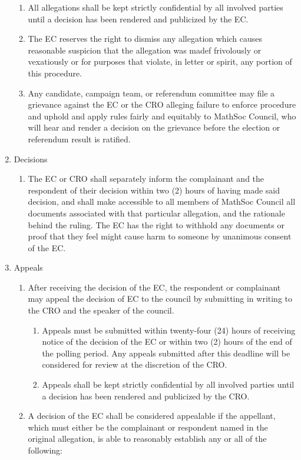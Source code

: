\begin{enumerate}
\begin{enumerate}
			\item All allegations shall be kept strictly confidential by all involved parties until a decision has been rendered and publicized by the EC.
			\item The EC reserves the right to dismiss any allegation which causes reasonable suspicion that the allegation was madef frivolously or vexatiously or for purposes that violate, in letter or spirit, any portion of this procedure.
			\item Any candidate, campaign team, or referendum committee may file a grievance against the EC or the CRO alleging failure to enforce procedure and uphold and apply rules fairly and equitably to MathSoc Council, who will hear and render a decision on the grievance before the election or referendum result is ratified.
		\end{enumerate}
	\item Decisions 
		\begin{enumerate}
			\item The EC or CRO shall separately inform the complainant and the respondent of their decision within two (2) hours of having made said decision, and shall make accessible to all members of MathSoc Council all documents associated with that particular allegation, and the rationale behind the ruling. The EC has the right to withhold any documents or proof that they feel might cause harm to someone by unanimous consent of the EC.
		\end{enumerate}
	\item Appeals 
		\begin{enumerate}
			\item After receiving the decision of the EC, the respondent or complainant may appeal the decision of EC to the council by submitting in writing to the CRO and the speaker of the council.
				\begin{enumerate}
					\item Appeals must be submitted within twenty-four (24) hours of receiving notice of the decision of the EC or within two (2) hours of the end of the polling period. Any appeals submitted after this deadline will be considered for review at the discretion of the CRO.
					\item Appeals shall be kept strictly confidential by all involved parties until a decision has been rendered and publicized by the CRO.
				\end{enumerate}
			\item A decision of the EC shall be considered appealable if the appellant, which must either be the complainant or respondent named in the original allegation, is able to reasonably establish any or all of the following:

\end{enumerate}
\end{enumerate}
